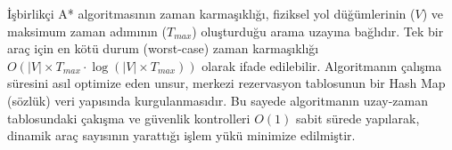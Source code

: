 İşbirlikçi A* algoritmasının zaman karmaşıklığı, fiziksel yol düğümlerinin ($V$) ve maksimum zaman adımının ($T_{max}$) oluşturduğu arama uzayına bağlıdır. Tek bir araç için en kötü durum (worst-case) zaman karmaşıklığı $O(|V| \times T_{max} \cdot \log(|V| \times T_{max}))$ olarak ifade edilebilir. Algoritmanın çalışma süresini asıl optimize eden unsur, merkezi rezervasyon tablosunun bir Hash Map (sözlük) veri yapısında kurgulanmasıdır. Bu sayede algoritmanın uzay-zaman tablosundaki çakışma ve güvenlik kontrolleri $O(1)$ sabit sürede yapılarak, dinamik araç sayısının yarattığı işlem yükü minimize edilmiştir.